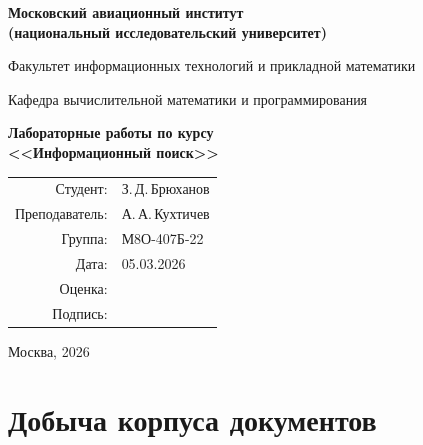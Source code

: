 \documentclass[12pt,a4paper]{article}
\begin{document}

\begin{titlepage}
    \centering
    \large

    \vspace*{1cm}

    \textbf{Московский авиационный институт}\\
    \textbf{(национальный исследовательский университет)}

    \vspace{1.5cm}

    Факультет информационных технологий и прикладной математики

    \vspace{0.5cm}

    Кафедра вычислительной математики и программирования

    \vspace{3cm}

    {\LARGE \textbf{Лабораторные работы по курсу}}\\
    \vspace{0.3cm}
    {\LARGE \textbf{<<Информационный поиск>>}}

    \vfill

    \begin{flushright}
        \begin{tabular}{rl}
            Студент: & З.\,Д.\,Брюханов \\
            Преподаватель: & А.\,А.\,Кухтичев \\
            Группа: & М8О-407Б-22 \\
            Дата: & 05.03.2026 \\
            Оценка: & \underline{\hspace{3cm}} \\
            Подпись: & \underline{\hspace{3cm}} \\
        \end{tabular}
    \end{flushright}

    \vspace{2cm}

    Москва, 2026
\end{titlepage}

\newpage


\section{Добыча корпуса документов}
\end{document}
